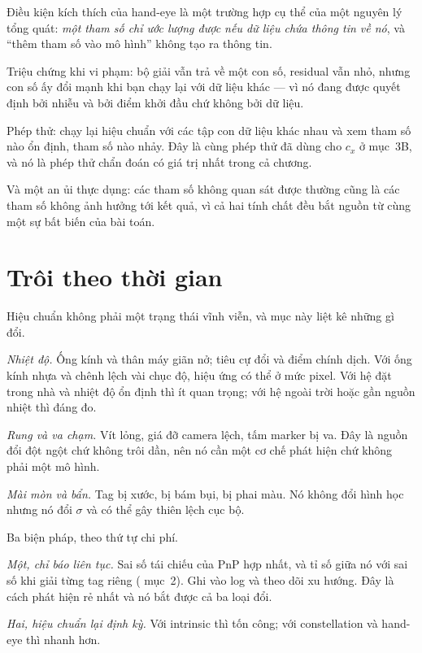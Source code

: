 \documentclass[../../marker.tex]{subfiles}
\begin{document}
\begin{cannho}
Điều kiện kích thích của hand-eye là một trường hợp cụ thể của một nguyên lý tổng quát: \emph{một tham số chỉ ước lượng được nếu dữ liệu chứa thông tin về nó}, và ``thêm tham số vào mô hình'' không tạo ra thông tin.

Triệu chứng khi vi phạm: bộ giải vẫn trả về một con số, residual vẫn nhỏ, nhưng con số ấy đổi mạnh khi bạn chạy lại với dữ liệu khác --- vì nó đang được quyết định bởi nhiễu và bởi điểm khởi đầu chứ không bởi dữ liệu.

Phép thử: chạy lại hiệu chuẩn với các tập con dữ liệu khác nhau và xem tham số nào ổn định, tham số nào nhảy. Đây là cùng phép thử đã dùng cho \(c_x\) ở mục~3B, và nó là phép thử chẩn đoán có giá trị nhất trong cả chương.

Và một an ủi thực dụng: các tham số không quan sát được thường cũng là các tham số không ảnh hưởng tới kết quả, vì cả hai tính chất đều bắt nguồn từ cùng một sự bất biến của bài toán.
\end{cannho}

\section{Trôi theo thời gian}

Hiệu chuẩn không phải một trạng thái vĩnh viễn, và mục này liệt kê những gì đổi.

\emph{Nhiệt độ.} Ống kính và thân máy giãn nở; tiêu cự đổi và điểm chính dịch. Với ống kính nhựa và chênh lệch vài chục độ, hiệu ứng có thể ở mức pixel. Với hệ đặt trong nhà và nhiệt độ ổn định thì ít quan trọng; với hệ ngoài trời hoặc gần nguồn nhiệt thì đáng đo.

\emph{Rung và va chạm.} Vít lỏng, giá đỡ camera lệch, tấm marker bị va. Đây là nguồn đổi đột ngột chứ không trôi dần, nên nó cần một cơ chế phát hiện chứ không phải một mô hình.

\emph{Mài mòn và bẩn.} Tag bị xước, bị bám bụi, bị phai màu. Nó không đổi hình học nhưng nó đổi \(\sigma\) và có thể gây thiên lệch cục bộ.

Ba biện pháp, theo thứ tự chi phí.

\emph{Một, chỉ báo liên tục.} Sai số tái chiếu của PnP hợp nhất, và tỉ số giữa nó với sai số khi giải từng tag riêng ( mục~2). Ghi vào log và theo dõi xu hướng. Đây là cách phát hiện rẻ nhất và nó bắt được cả ba loại đổi.

\emph{Hai, hiệu chuẩn lại định kỳ.} Với intrinsic thì tốn công; với constellation và hand-eye thì nhanh hơn.
\end{document}
